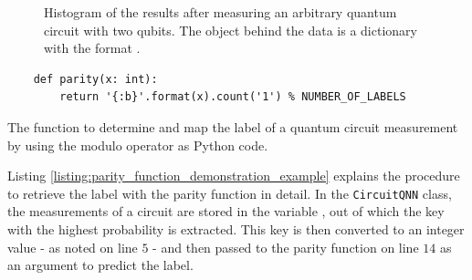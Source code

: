 \begin{figure}[!h]
    \centering
    \caption{Histogram of the results after measuring an arbitrary quantum circuit with two qubits. The  object behind the data is a dictionary with the format .}
    \label{figure:parity_function_example_histogram}
\end{figure}

\begin{listing}[!h]
    \begin{verbatim}
    def parity(x: int):
        return '{:b}'.format(x).count('1') % NUMBER_OF_LABELS
    \end{verbatim}
    \caption{The  function to determine and map the label of a quantum circuit measurement by using the modulo operator as Python code.}
    \label{listing:parity_function}
\end{listing}

Listing \ref{listing:parity_function_demonstration_example} explains the procedure to retrieve the label with the parity function in detail. In the \texttt{CircuitQNN} class, the measurements of a circuit are stored in the variable , out of which the key with the highest probability is extracted. This key is then converted to an integer value -  as noted on line $5$ - and then passed to the parity function on line $14$ as an argument to predict the label.

